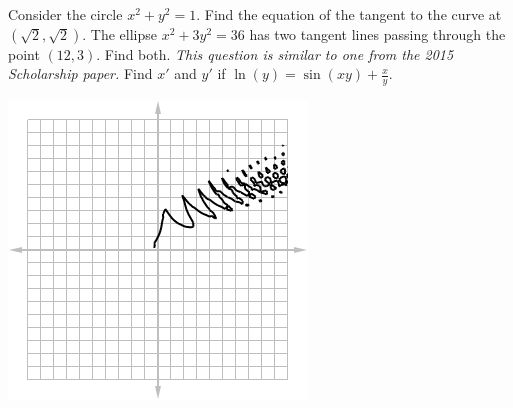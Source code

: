 \begin{questions}
  \questioM Consider the circle $ x^2 + y^2 = 1 $. Find the equation of the tangent to the curve at $ (\sqrt{2}, \sqrt{2}) $.
  \questioS The ellipse $ x^2 + 3y^2 = 36 $ has two tangent lines passing through the point $ (12, 3) $. Find both.
    \textit{This question is similar to one from the 2015 Scholarship paper.}
  \questioM Find $ x' $ and $ y' $ if $ \ln(y) = \sin(xy) + \frac{x}{y} $.
            \begin{center}
              \includegraphics[width=0.3\linewidth]{implicit13}

\end{center}
\end{questions}
